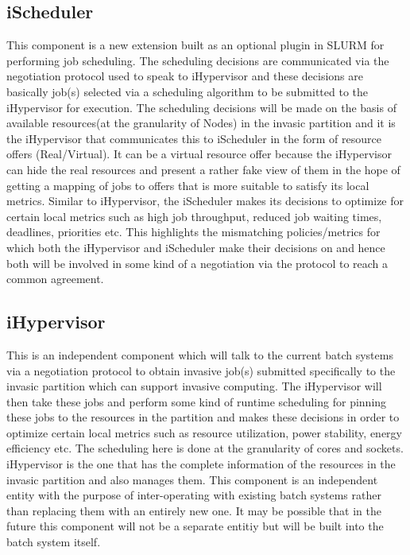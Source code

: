 \subsection{iScheduler}
This component is a new extension built as an optional plugin in SLURM for performing job scheduling. The scheduling decisions are communicated via the negotiation protocol used to speak to iHypervisor and these decisions are basically job(s) selected via a scheduling algorithm to be
submitted to the iHypervisor for execution. The scheduling decisions will be made on the basis of available resources(at the granularity of Nodes) in the invasic partition and it is the iHypervisor that communicates this to iScheduler in the form of resource offers (Real/Virtual). It can be a virtual resource offer because the iHypervisor can hide the real resources and present a rather fake view of them in the hope of getting a mapping of jobs to offers that is more suitable to satisfy its local metrics. Similar to iHypervisor, the iScheduler makes its decisions to optimize for certain local metrics such as high job throughput, reduced job waiting times, deadlines, priorities etc. This highlights the mismatching policies/metrics for which both the iHypervisor and iScheduler make their decisions on and hence both will be involved in some kind of a negotiation via the protocol to reach a common agreement.\par
\subsection{iHypervisor}
This is an independent component which will talk to the current batch systems via a negotiation protocol to obtain invasive job(s) submitted specifically to the invasic partition which can support invasive computing. The iHypervisor will then take these jobs and perform some kind of runtime scheduling for pinning these jobs to the resources in the partition and makes these decisions in order to optimize certain local metrics such as resource utilization, power stability, energy efficiency etc. The scheduling here is done at the granularity of cores and sockets. iHypervisor is the one that has the complete information of the resources in the invasic partition and also manages them. This component is an independent entity with the purpose of inter-operating with existing batch systems rather than replacing them with an entirely new one. It may be possible that in the future this component will not be a separate entitiy but will be built into the batch system itself.\par
